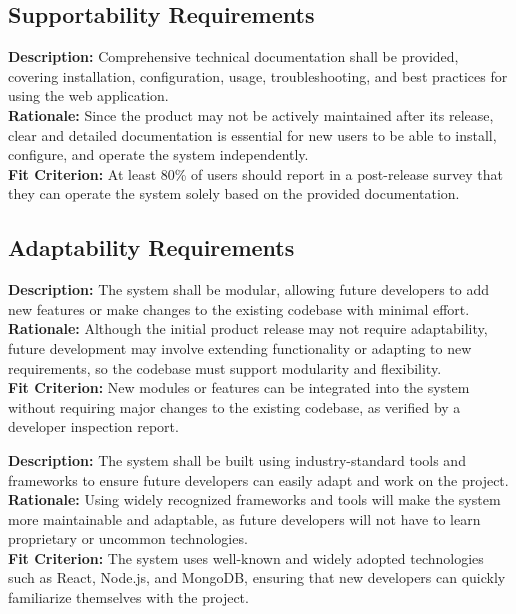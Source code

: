 \documentclass[12pt]{article}
\begin{document}
\vspace{0.5cm}

\subsection{Supportability Requirements}

\begin{tcolorbox}[title=MSS1]
\textbf{Description:} Comprehensive technical documentation shall be provided, covering installation, configuration, usage, troubleshooting, and best practices for using the web application. \\
\textbf{Rationale:} Since the product may not be actively maintained after its release, clear and detailed documentation is essential for new users to be able to install, configure, and operate the system independently. \\
\textbf{Fit Criterion:} At least 80\% of users should report in a post-release survey that they can operate the system solely based on the provided documentation.
\end{tcolorbox}

\vspace{0.5cm}

\subsection{Adaptability Requirements}

\begin{tcolorbox}[title=MSA1]
\textbf{Description:} The system shall be modular, allowing future developers to add new features or make changes to the existing codebase with minimal effort. \\
\textbf{Rationale:} Although the initial product release may not require adaptability, future development may involve extending functionality or adapting to new requirements, so the codebase must support modularity and flexibility. \\
\textbf{Fit Criterion:} New modules or features can be integrated into the system without requiring major changes to the existing codebase, as verified by a developer inspection report.
\end{tcolorbox}

\vspace{0.5cm}

\begin{tcolorbox}[title=MSA2]
\textbf{Description:} The system shall be built using industry-standard tools and frameworks to ensure future developers can easily adapt and work on the project. \\
\textbf{Rationale:} Using widely recognized frameworks and tools will make the system more maintainable and adaptable, as future developers will not have to learn proprietary or uncommon technologies. \\
\textbf{Fit Criterion:} The system uses well-known and widely adopted technologies such as React, Node.js, and MongoDB, ensuring that new developers can quickly familiarize themselves with the project.
\end{tcolorbox}
\end{document}
